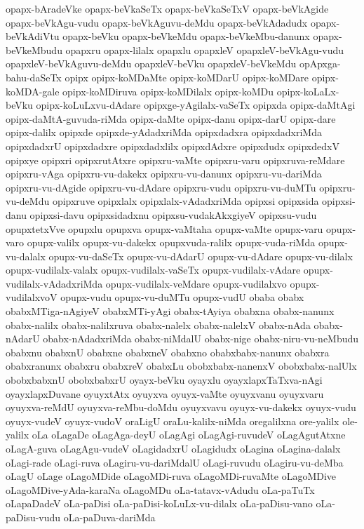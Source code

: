 {opapx-bAradeVke
opapx-beVkaSeTx
opapx-beVkaSeTxV
opapx-beVkAgide
opapx-beVkAgu-vudu
opapx-beVkAguvu-deMdu
opapx-beVkAdadudx
opapx-beVkAdiVtu
opapx-beVku
opapx-beVkeMdu
opapx-beVkeMbu-danunx
opapx-beVkeMbudu
opapxru
opapx-lilalx
opapxlu
opapxleV
opapxleV-beVkAgu-vudu
opapxleV-beVkAguvu-deMdu
opapxleV-beVku
opapxleV-beVkeMdu
opApxga-bahu-daSeTx
opipx
opipx-koMDaMte
opipx-koMDarU
opipx-koMDare
opipx-koMDA-gale
opipx-koMDiruva
opipx-koMDilalx
opipx-koMDu
opipx-koLaLx-beVku
opipx-koLuLxvu-dAdare
opipxge-yAgilalx-vaSeTx
opipxda
opipx-daMtAgi
opipx-daMtA-guvuda-riMda
opipx-daMte
opipx-danu
opipx-darU
opipx-dare
opipx-dalilx
opipxde
opipxde-yAdadxriMda
opipxdadxra
opipxdadxriMda
opipxdadxrU
opipxdadxre
opipxdadxlilx
opipxdAdxre
opipxdudx
opipxdedxV
opipxye
opipxri
opipxrutAtxre
opipxru-vaMte
opipxru-varu
opipxruva-reMdare
opipxru-vAga
opipxru-vu-dakekx
opipxru-vu-danunx
opipxru-vu-dariMda
opipxru-vu-dAgide
opipxru-vu-dAdare
opipxru-vudu
opipxru-vu-duMTu
opipxru-vu-deMdu
opipxruve
opipxlalx
opipxlalx-vAdadxriMda
opipxsi
opipxsida
opipxsi-danu
opipxsi-davu
opipxsidadxnu
opipxsu-vudakAkxgiyeV
opipxsu-vudu
opupxtetxVve
opupxlu
opupxva
opupx-vaMtaha
opupx-vaMte
opupx-varu
opupx-varo
opupx-valilx
opupx-vu-dakekx
opupxvuda-ralilx
opupx-vuda-riMda
opupx-vu-dalalx
opupx-vu-daSeTx
opupx-vu-dAdarU
opupx-vu-dAdare
opupx-vu-dilalx
opupx-vudilalx-valalx
opupx-vudilalx-vaSeTx
opupx-vudilalx-vAdare
opupx-vudilalx-vAdadxriMda
opupx-vudilalx-veMdare
opupx-vudilalxvo
opupx-vudilalxvoV
opupx-vudu
opupx-vu-duMTu
opupx-vudU
obaba
obabx
obabxMTiga-nAgiyeV
obabxMTi-yAgi
obabx-tAyiya
obabxna
obabx-nanunx
obabx-nalilx
obabx-nalilxruva
obabx-nalelx
obabx-nalelxV
obabx-nAda
obabx-nAdarU
obabx-nAdadxriMda
obabx-niMdalU
obabx-nige
obabx-niru-vu-neMbudu
obabxnu
obabxnU
obabxne
obabxneV
obabxno
obabxbabx-nanunx
obabxra
obabxranunx
obabxru
obabxreV
obabxLu
obobxbabx-nanenxV
obobxbabx-nalUlx
obobxbabxnU
obobxbabxrU
oyayx-beVku
oyayxlu
oyayxlapxTaTxva-nAgi
oyayxlapxDuvane
oyuyxtAtx
oyuyxva
oyuyx-vaMte
oyuyxvanu
oyuyxvaru
oyuyxva-reMdU
oyuyxva-reMbu-doMdu
oyuyxvavu
oyuyx-vu-dakekx
oyuyx-vudu
oyuyx-vudeV
oyuyx-vudoV
oraLigU
oraLu-kalilx-niMda
oregalilxna
ore-yalilx
ole-yalilx
oLa
oLagaDe
oLagAga-deyU
oLagAgi
oLagAgi-ruvudeV
oLagAgutAtxne
oLagA-guva
oLagAgu-vudeV
oLagidadxrU
oLagidudx
oLagina
oLagina-dalalx
oLagi-rade
oLagi-ruva
oLagiru-vu-dariMdalU
oLagi-ruvudu
oLagiru-vu-deMba
oLagU
oLage
oLagoMDide
oLagoMDi-ruva
oLagoMDi-ruvaMte
oLagoMDive
oLagoMDive-yAda-karaNa
oLagoMDu
oLa-tatavx-vAdudu
oLa-paTuTx
oLapaDadeV
oLa-paDisi
oLa-paDisi-koLuLx-vu-dilalx
oLa-paDisu-vano
oLa-paDisu-vudu
oLa-paDuva-dariMda
}
